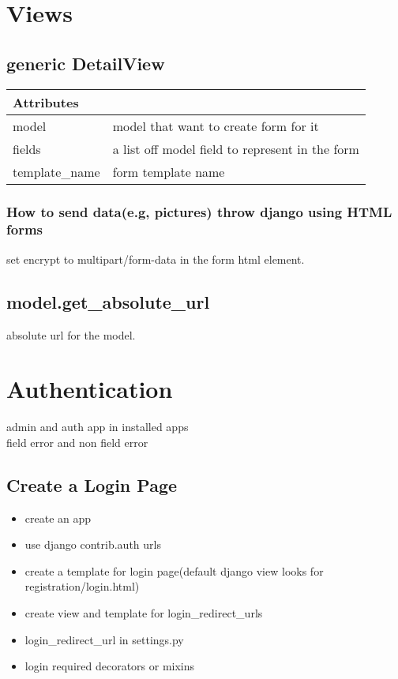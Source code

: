 \documentclass{article}
\begin{document}
	\section{Views}
		\subsection{generic DetailView}
			\begin{tabular}{ll}
				\hline
				Attributes & \\ \hline
				model & model that want to create form for it \\
				fields & a list off model field to represent in the form\\
				template\_name & form template name 
			\end{tabular}
			\subsubsection{How to send data(e.g, pictures) throw django using HTML forms}
				set encrypt to multipart/form-data in the form html element.
			\subsection{model.get\_absolute\_url}
				absolute url for the model.
	\section{Authentication}
	
		admin and auth app in installed apps\\
		field error and non field error
		
		\subsection{Create a Login Page}
			\begin{itemize}
				\item create an app
				\item use django contrib.auth urls
				\item create a template for login page(default django view looks for registration/login.html)
				\item create view and template for login\_redirect\_urls
				\item login\_redirect\_url in settings.py
				\item login required decorators or mixins
			\end{itemize}
			
\end{document}
